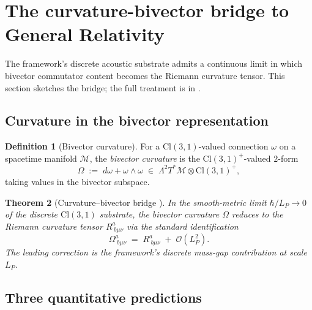 \documentclass[11pt,a4paper]{article}
\theoremstyle{plain}
\newtheorem{theorem}{Theorem}[section]
\theoremstyle{definition}
\newtheorem{definition}[theorem]{Definition}
\theoremstyle{remark}
\numberwithin{equation}{section}
\providecommand{\Cl}{\mathrm{Cl}}
\begin{document}
\section{The curvature-bivector bridge to General Relativity}
\label{sec:gr-bridge}

The framework's discrete acoustic substrate admits a continuous
limit in which bivector commutator content becomes the Riemann
curvature tensor.  This section sketches the bridge; the full
treatment is in \cite{kg-paper}.

\subsection{Curvature in the bivector representation}

\begin{definition}[Bivector curvature]
\label{def:bivector-curvature}
For a $\Cl(3,1)$-valued connection $\omega$ on a spacetime
manifold $\mathcal{M}$, the \emph{bivector curvature} is the
$\Cl(3,1)^+$-valued $2$-form
\[
  \Omega \;:=\; d\omega + \omega \wedge \omega \;\in\;
  \Lambda^2 T^*\mathcal{M} \otimes \Cl(3,1)^+,
\]
taking values in the bivector subspace.
\end{definition}

\begin{theorem}[Curvature--bivector bridge {\cite[Thm.~3.2]{kg-paper}}]
\label{thm:gr-bridge}
In the smooth-metric limit $\hbar/L_P \to 0$ of the discrete
$\Cl(3,1)$ substrate, the bivector curvature $\Omega$ reduces to
the Riemann curvature tensor $R^a_{\;b\mu\nu}$ via the standard
identification
\[
  \Omega^a_{\;b\mu\nu} \;=\; R^a_{\;b\mu\nu} \;+\; \mathcal{O}(L_P^2).
\]
The leading correction is the framework's discrete mass-gap
contribution at scale $L_P$.
\end{theorem}

\subsection{Three quantitative predictions}
\end{document}
